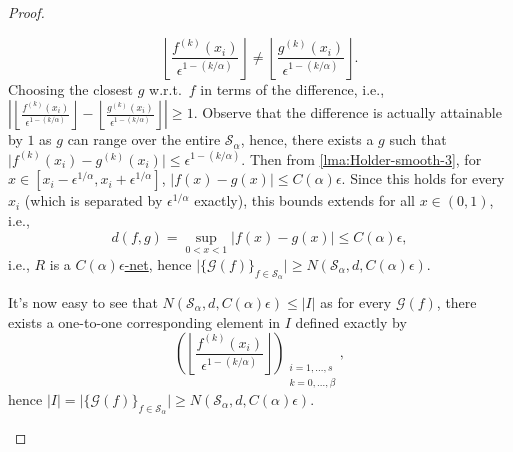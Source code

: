 \begin{proof}
\begin{explanation}
		\[
			\left\lfloor \frac{f^{(k)}(x_i)}{\epsilon ^{1 - (k / \alpha )}} \right\rfloor
			\neq \left\lfloor \frac{g^{(k)}(x_i)}{\epsilon ^{1 - (k / \alpha )}} \right\rfloor.
		\]
		Choosing the closest \(g\) w.r.t.\ \(f\) in terms of the difference, i.e., \(\left\vert \left\lfloor \frac{f^{(k)}(x_i)}{\epsilon ^{1 - (k / \alpha )}} \right\rfloor - \left\lfloor \frac{g^{(k)}(x_i)}{\epsilon ^{1 - (k / \alpha )}} \right\rfloor \right\vert \geq 1\). Observe that the difference is actually attainable by \(1\) as \(g\) can range over the entire \(\mathcal{S} _\alpha \), hence, there exists a \(g\) such that \(\vert f^{(k)}(x_i) - g^{(k)}(x_i) \vert \leq \epsilon ^{1 - (k / \alpha )}\). Then from \autoref{lma:Holder-smooth-3}, for \(x \in [x_i - \epsilon ^{1 / \alpha }, x_i + \epsilon ^{1 / \alpha }]\), \(\vert f(x) - g(x) \vert \leq C(\alpha )\epsilon\). Since this holds for every \(x_i\) (which is separated by \(\epsilon ^{1 / \alpha }\) exactly), this bounds extends for all \(x\in (0, 1)\), i.e.,
		\[
			d (f, g)
			= \sup _{0 < x < 1} \vert f(x) - g(x) \vert
			\leq C(\alpha )\epsilon,
		\]
		i.e., \(R\) is a \hyperref[def:eps-net]{\(C(\alpha )\epsilon \)-net}, hence \(\vert \{ \mathcal{G} (f) \}_{f\in \mathcal{S} _\alpha } \vert \geq N(\mathcal{S} _\alpha , d , C(\alpha )\epsilon)\).

		It's now easy to see that \(N(\mathcal{S} _\alpha , d , C(\alpha )\epsilon ) \leq \vert I \vert \) as for every \(\mathcal{G} (f)\), there exists a one-to-one corresponding element in \(I\) defined exactly by
		\[
			\left( \left\lfloor \frac{f^{(k)}(x_i)}{\epsilon ^{1 - (k / \alpha )}} \right\rfloor \right) _{\substack{i = 1, \dots , s \\ k = 0, \dots , \beta }},
		\]
		hence \(\vert I \vert = \vert \{ \mathcal{G} (f) \}_{f\in \mathcal{S} _\alpha }\vert \geq N(\mathcal{S} _\alpha , d , C(\alpha )\epsilon)\).
	\end{explanation}


\end{proof}
